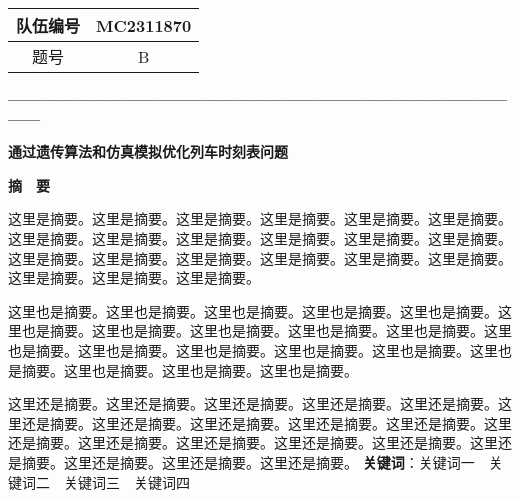 \thispagestyle{empty}   %

\begin{table}[h]
    \centering
    \begin{tabular}{|c|c|}
    \hline
    队伍编号 & MC2311870 \\ \hline
    题号   & B         \\ \hline
    \end{tabular}
\end{table}



\begin{center}
    \textbf{—————————————————————————————————}

    \textbf{\fontsize{20}{1.5}通过遗传算法和仿真模拟优化列车时刻表问题}

    \textbf{摘　要}
\end{center}





%
%

这里是摘要。这里是摘要。这里是摘要。这里是摘要。这里是摘要。这里是摘要。这里是摘要。这里是摘要。这里是摘要。这里是摘要。这里是摘要。这里是摘要。这里是摘要。这里是摘要。这里是摘要。这里是摘要。这里是摘要。这里是摘要。这里是摘要。这里是摘要。这里是摘要。

这里也是摘要。这里也是摘要。这里也是摘要。这里也是摘要。这里也是摘要。这里也是摘要。这里也是摘要。这里也是摘要。这里也是摘要。这里也是摘要。这里也是摘要。这里也是摘要。这里也是摘要。这里也是摘要。这里也是摘要。这里也是摘要。这里也是摘要。这里也是摘要。这里也是摘要。

这里还是摘要。这里还是摘要。这里还是摘要。这里还是摘要。这里还是摘要。这里还是摘要。这里还是摘要。这里还是摘要。这里还是摘要。这里还是摘要。这里还是摘要。这里还是摘要。这里还是摘要。这里还是摘要。这里还是摘要。这里还是摘要。这里还是摘要。这里还是摘要。这里还是摘要。\newline
\newline
\textbf{关键词}：关键词一　关键词二　关键词三　关键词四



%
%

\newpage
\tableofcontents
\thispagestyle{empty}
